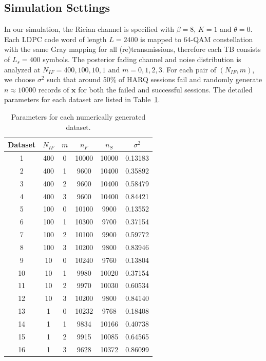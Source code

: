 \documentclass[journal,draftcls,onecolumn,12pt,twoside]{IEEEtran}
\begin{document}
\subsection{Simulation Settings}
In our simulation, the Rician channel is specified with $\beta = 8$, $K = 1$ and
$\theta = 0$. Each LDPC code word of length $L=2400$ is mapped to 64-QAM
constellation with the same Gray mapping for all (re)transmissions, therefore
each TB consists of $L_s = 400$ symbols. The posterior fading channel and noise
distribution is analyzed at $N_{IF} = 400, 100, 10, 1$ and $m = 0, 1, 2, 3$. For
each pair of $(N_{IF}, m)$, we choose $\sigma^2$ such that around 50\% of HARQ
sessions fail and randomly generate $n\approx 10000$ records of $\mathbf{x}$
for both the failed and successful sessions. %
The detailed parameters for each dataset are listed in
Table~\ref{tab:settings}.
\begin{table}[!t]
  \renewcommand{\arraystretch}{1.3}
  \caption{Parameters for each numerically generated dataset.}
  \label{tab:settings}
  \centering
  \begin{tabular}{c|ccccc}
    \hline
    Dataset & $N_{IF}$ & $m$ & $n_{F}$ & $n_{S}$ & $\sigma^2$ \\
    \hline
    1 & 400 & 0 & 10000 & 10000 & 0.13183 \\
    2 & 400 & 1 & 9600  & 10400 & 0.35892 \\
    3 & 400 & 2 & 9600 & 10400 & 0.58479 \\
    4 & 400 & 3 & 9600 & 10400 & 0.84421 \\
    \hline
    5 & 100 & 0 & 10100 & 9900 & 0.13552 \\
    6 & 100 & 1 & 10300 & 9700 & 0.37154 \\
    7 & 100 & 2 & 10100 & 9900 & 0.59772 \\
    8 & 100 & 3 & 10200 & 9800 & 0.83946 \\
    \hline
    9 & 10 & 0 & 10240 & 9760 & 0.13804 \\
    10 & 10 & 1 & 9980 & 10020 & 0.37154 \\
    11 & 10 & 2 & 9970 & 10030 & 0.60534 \\
    12 & 10 & 3 & 10200 & 9800 & 0.84140 \\
    \hline
    13 & 1 & 0 & 10232 & 9768 & 0.18408 \\
    14 & 1 & 1 & 9834 & 10166 & 0.40738 \\
    15 & 1 & 2 & 9915 & 10085 & 0.64565 \\
    16 & 1 & 3 & 9628 & 10372 & 0.86099 \\
    \hline
  \end{tabular}
\end{table}
  
\end{document}
